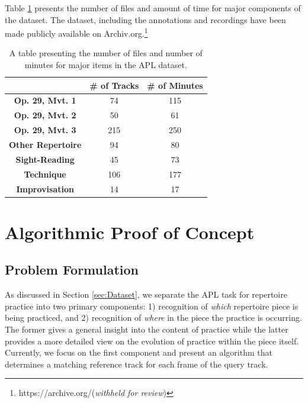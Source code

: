 \documentclass{article}
\begin{document}
Table \ref{tab:stats} presents the number of files and amount of time for major components of the dataset. The dataset, including the annotations and recordings have been made publicly available on Archiv.org.\footnote{https://archive.org/(\textit{withheld for review})}
\begin{table}[ht!]
\centering
\caption{A table presenting the number of files and number of minutes for major items in the APL dataset.}
\begin{tabular}{|c|c|c|}
\hline
& \textbf{\# of Tracks} & \textbf{\# of Minutes}\\\hline
\textbf{Op. 29, Mvt. 1} & 74 & 115 \\\hline
\textbf{Op. 29, Mvt. 2} & 50 & 61 \\\hline
\textbf{Op. 29, Mvt. 3} & 215 & 250 \\\hline
\textbf{Other Repertoire} & 94 & 80\\\hline
\textbf{Sight-Reading} & 45 & 73 \\\hline
\textbf{Technique} & 106 & 177 \\\hline
\textbf{Improvisation} & 14 & 17\\\hline
\end{tabular}
\label{tab:stats}
\end{table}


\section{Algorithmic Proof of Concept}

\subsection{Problem Formulation}
As discussed in Section \ref{sec:Dataset}, we separate the APL task for repertoire practice into two primary components: 1) recognition of \textit{which} repertoire piece is being practiced, and 2) recognition of \textit{where} in the piece the practice is occurring.  The former  gives a general insight into the content of practice while the latter provides a more detailed view on the evolution of practice within the piece itself. Currently, we focus on the first component and present an algorithm that determines a matching reference track for each frame of the query track.
\end{document}
